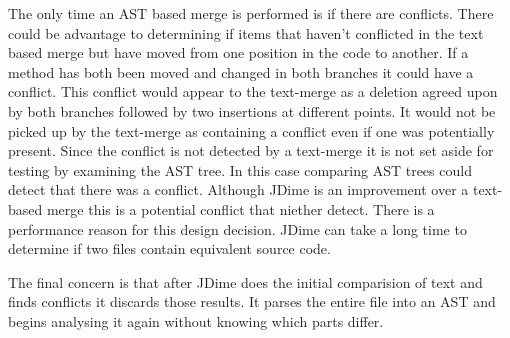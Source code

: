 The only time an AST based merge is performed is if there are conflicts.  There could be advantage to determining if items that haven't conflicted in the text based merge but have moved from one position in the code to another.  If a method has both been moved and changed in both branches it could have a conflict.  This conflict would appear to the text-merge as a deletion agreed upon by both branches followed by two insertions at different points.  It would not be picked up by the text-merge as containing a conflict even if one was potentially present.  Since the conflict is not detected by a text-merge it is not set aside for testing by examining the AST tree. In this case comparing AST trees could detect that there was a conflict. Although JDime is an improvement over a text-based merge this is a potential conflict that niether detect. There is a performance reason for this design decision. JDime can take a long time to determine if two files contain equivalent source code.

The final concern is that after JDime does the initial comparision of text and finds conflicts it discards those results. It parses the entire file into an AST and begins analysing it again without knowing which parts differ.   






 
 


